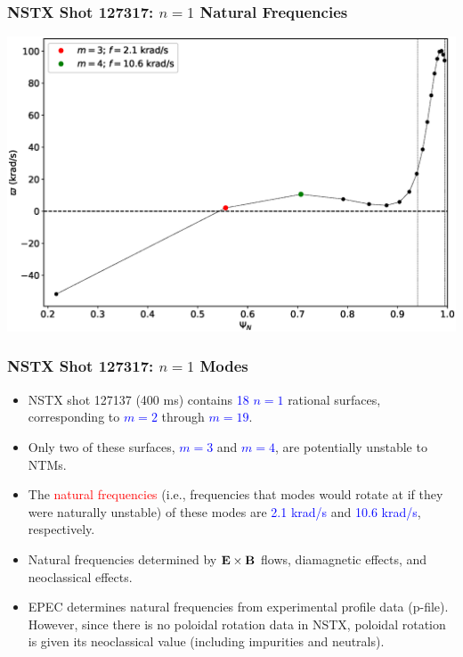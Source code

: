 \documentclass{beamer}
\newcommand{\blue}[1]{\textcolor{blue}{#1}}
\newcommand{\red}[1]{\textcolor{red}{#1}}
\begin{document}
\begin{frame}
\frametitle{NSTX Shot 127317: $n=1$ Natural Frequencies}

\begin{center}
\includegraphics[width=\textwidth]{Frequency.eps}
\end{center}
\end{frame}

\begin{frame}
\frametitle{NSTX Shot 127317: $n=1$ Modes}
\begin{itemize}
\item NSTX shot 127137 (400 ms) contains \blue{18 $n=1$} rational surfaces, corresponding to \blue{$m=2$} through
\blue{$m=19$}. 
\item Only two of these surfaces, \blue{$m=3$} and \blue{$m=4$}, are potentially unstable to NTMs.  
\item The \red{natural frequencies} (i.e., frequencies that modes would rotate at if they were naturally unstable) of
these modes are \blue{2.1 krad/s} and \blue{10.6 krad/s}, respectively. 
\item Natural frequencies determined by \blue{${\bf E}\times {\bf B}$} flows, diamagnetic effects, and neoclassical
effects. 
\item EPEC determines natural frequencies from experimental profile data (p-file). However, since there is no
poloidal rotation data in NSTX, poloidal rotation is given its neoclassical value (including impurities and neutrals). 
\end{itemize}
\end{frame}
\end{document}
